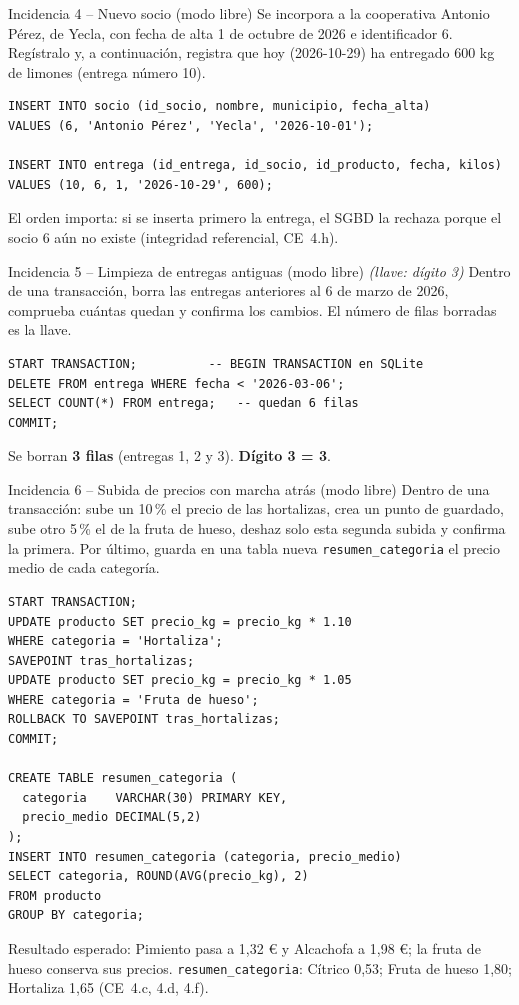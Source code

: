 \documentclass[11pt,a4paper]{article}
\begin{document}
\begin{reto}{Incidencia 4 -- Nuevo socio (modo libre)}
Se incorpora a la cooperativa Antonio Pérez, de Yecla, con fecha de alta 1 de octubre de
2026 e identificador 6. Regístralo y, a continuación, registra que hoy (2026-10-29) ha
entregado 600 kg de limones (entrega número 10).
\end{reto}
\begin{solucion}
\begin{lstlisting}
INSERT INTO socio (id_socio, nombre, municipio, fecha_alta)
VALUES (6, 'Antonio Pérez', 'Yecla', '2026-10-01');

INSERT INTO entrega (id_entrega, id_socio, id_producto, fecha, kilos)
VALUES (10, 6, 1, '2026-10-29', 600);
\end{lstlisting}
El orden importa: si se inserta primero la entrega, el SGBD la rechaza porque el socio
6 aún no existe (integridad referencial, CE~4.h).
\end{solucion}

\begin{reto}{Incidencia 5 -- Limpieza de entregas antiguas (modo libre) \emph{(llave: dígito 3)}}
Dentro de una transacción, borra las entregas anteriores al 6 de marzo de 2026, comprueba
cuántas quedan y confirma los cambios. El número de filas borradas es la llave.
\end{reto}
\begin{solucion}
\begin{lstlisting}
START TRANSACTION;          -- BEGIN TRANSACTION en SQLite
DELETE FROM entrega WHERE fecha < '2026-03-06';
SELECT COUNT(*) FROM entrega;   -- quedan 6 filas
COMMIT;
\end{lstlisting}
Se borran \textbf{3 filas} (entregas 1, 2 y 3). \textbf{Dígito 3 = 3}.
\end{solucion}

\begin{reto}{Incidencia 6 -- Subida de precios con marcha atrás (modo libre)}
Dentro de una transacción: sube un 10\,\% el precio de las hortalizas, crea un punto de
guardado, sube otro 5\,\% el de la fruta de hueso, deshaz solo esta segunda subida y
confirma la primera. Por último, guarda en una tabla nueva \texttt{resumen\_categoria}
el precio medio de cada categoría.
\end{reto}
\begin{solucion}
\begin{lstlisting}
START TRANSACTION;
UPDATE producto SET precio_kg = precio_kg * 1.10
WHERE categoria = 'Hortaliza';
SAVEPOINT tras_hortalizas;
UPDATE producto SET precio_kg = precio_kg * 1.05
WHERE categoria = 'Fruta de hueso';
ROLLBACK TO SAVEPOINT tras_hortalizas;
COMMIT;

CREATE TABLE resumen_categoria (
  categoria    VARCHAR(30) PRIMARY KEY,
  precio_medio DECIMAL(5,2)
);
INSERT INTO resumen_categoria (categoria, precio_medio)
SELECT categoria, ROUND(AVG(precio_kg), 2)
FROM producto
GROUP BY categoria;
\end{lstlisting}
Resultado esperado: Pimiento pasa a 1,32 € y Alcachofa a 1,98 €; la fruta de hueso
conserva sus precios. \texttt{resumen\_categoria}: Cítrico 0,53; Fruta de hueso 1,80;
Hortaliza 1,65 (CE~4.c, 4.d, 4.f).
\end{solucion}
\end{document}
